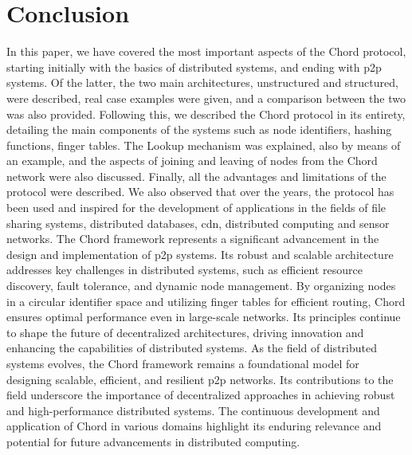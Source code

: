 \chapter{Conclusion}\label{chap:conclusion}
In this paper, we have covered the most important aspects of the Chord protocol, starting initially with the basics of distributed systems, and ending with \gls{p2p} systems. Of the latter, the two main architectures, unstructured and structured, were described, real case examples were given, and a comparison between the two was also provided.
Following this, we described the Chord protocol in its entirety, detailing the main components of the systems such as node identifiers, hashing functions, finger tables.
The Lookup mechanism was explained, also by means of an example, and the aspects of joining and leaving of nodes from the Chord network were also discussed.
Finally, all the advantages and limitations of the protocol were described. 
We also observed that over the years, the protocol has been used and inspired for the development of applications in the fields of file sharing systems, distributed databases, \gls{cdn}, distributed computing and sensor networks.
The Chord framework represents a significant advancement in the design and implementation of \gls{p2p} systems.
Its robust and scalable architecture addresses key challenges in distributed systems, such as efficient resource discovery, fault tolerance, and dynamic node management.
By organizing nodes in a circular identifier space and utilizing finger tables for efficient routing, Chord ensures optimal performance even in large-scale networks.
Its principles continue to shape the future of decentralized architectures, driving innovation and enhancing the capabilities of distributed systems.
As the field of distributed systems evolves, the Chord framework remains a foundational model for designing scalable, efficient, and resilient \gls{p2p} networks.
Its contributions to the field underscore the importance of decentralized approaches in achieving robust and high-performance distributed systems.
The continuous development and application of Chord in various domains highlight its enduring relevance and potential for future advancements in distributed computing.